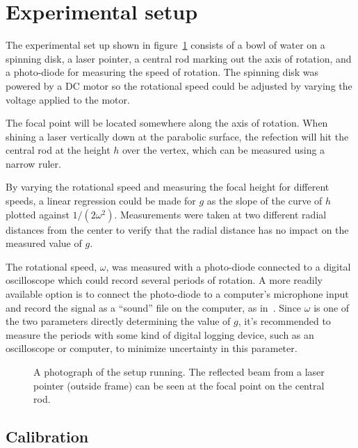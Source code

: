 \documentclass[12pt, a4paper, twocolumn]{article}
\begin{document}
\section{Experimental setup}

The experimental set up shown in figure~\ref{fig:rot_bowl_pic} consists of a bowl of water on a spinning disk, a laser pointer, a central rod marking out the axis of rotation, and a photo-diode for measuring the speed of rotation. The spinning disk was powered by a DC motor so the rotational speed could be adjusted by varying the voltage applied to the motor. 

The focal point will be located somewhere along the axis of rotation. When shining a laser vertically down at the parabolic surface, the refection will hit the central rod at the height $h$ over the vertex, which can be measured using a narrow ruler. 

By varying the rotational speed and measuring the focal height for
different speeds, a linear regression could be made for $g$ as the
slope of the curve of $h$ plotted against $1/(2\omega^2)$. 
Measurements were taken at two different radial distances from the
center to verify that the radial distance has no impact on the measured value of $g$. 

The rotational speed, $\omega$, was measured with a photo-diode connected to a digital oscilloscope which could record several periods of rotation. A more readily available option is to connect the photo-diode to a computer's microphone input and record the signal as a ``sound'' file on the computer, as in~\cite{Sabatka2010}. Since $\omega$ is one of the two parameters directly determining the value of $g$, it's recommended to measure the periods with some kind of digital logging device, such as an oscilloscope or computer, to minimize uncertainty in this parameter.

\begin{figure}
\centering
\resizebox{6cm}{!}{}
\caption{A photograph of the setup running. The reflected beam from a laser pointer (outside frame) can be seen at the focal point on the central rod. %
} 
\label{fig:rot_bowl_pic} 
\end{figure}


\subsection{Calibration}
\end{document}
